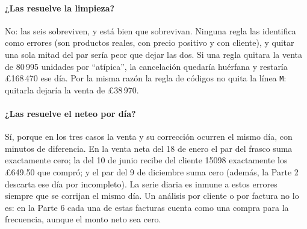 \paragraph{¿Las resuelve la limpieza?} No: las seis sobreviven, y está bien
que sobrevivan. Ninguna regla las identifica como errores (son productos
reales, con precio positivo y con cliente), y quitar una sola mitad del par
sería peor que dejar las dos. Si una regla quitara la venta de 80\,995
unidades por ``atípica'', la cancelación quedaría huérfana y restaría
\pounds168\,470 ese día. Por la misma razón la regla de códigos no quita la
línea \texttt{M}: quitarla dejaría la venta de \pounds38\,970.

\paragraph{¿Las resuelve el neteo por día?} Sí, porque en los tres casos la
venta y su corrección ocurren el mismo día, con minutos de diferencia. En la
venta neta del 18 de enero el par del frasco suma exactamente cero; la del 10
de junio recibe del cliente 15098 exactamente los \pounds649.50 que compró; y
el par del 9 de diciembre suma cero (además, la Parte 2 descarta ese día por
incompleto). La serie diaria es inmune a estos errores siempre que se corrijan
el mismo día. Un análisis por cliente o por factura no lo es: en la Parte 6
cada una de estas facturas cuenta como una compra para la frecuencia, aunque
el monto neto sea cero.
